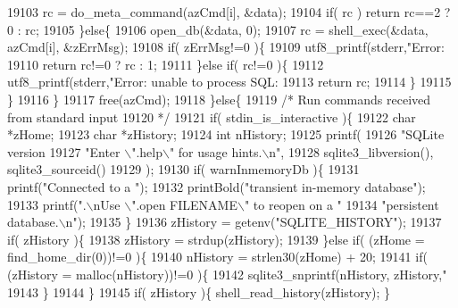 \begin{DoxyCode}
{{{{{{{{{{{{19103         rc = do_meta_command(azCmd[i], &data);
19104         \textcolor{keywordflow}{if}( rc ) \textcolor{keywordflow}{return} rc==2 ? 0 : rc;
19105       \}\textcolor{keywordflow}{else}\{
19106         open_db(&data, 0);
19107         rc = shell_exec(&data, azCmd[i], &zErrMsg);
19108         \textcolor{keywordflow}{if}( zErrMsg!=0 )\{
19109           utf8_printf(stderr,\textcolor{stringliteral}{"Error: %
19110           \textcolor{keywordflow}{return} rc!=0 ? rc : 1;
19111         \}\textcolor{keywordflow}{else} \textcolor{keywordflow}{if}( rc!=0 )\{
19112           utf8_printf(stderr,\textcolor{stringliteral}{"Error: unable to process SQL: %
19113           \textcolor{keywordflow}{return} rc;
19114         \}
19115       \}
19116     \}
19117     free(azCmd);
19118   \}\textcolor{keywordflow}{else}\{
19119     \textcolor{comment}{/* Run commands received from standard input}
19120 \textcolor{comment}{    */}
19121     \textcolor{keywordflow}{if}( stdin_is_interactive )\{
19122       \textcolor{keywordtype}{char} *zHome;
19123       \textcolor{keywordtype}{char} *zHistory;
19124       \textcolor{keywordtype}{int} nHistory;
19125       printf(
19126         \textcolor{stringliteral}{"SQLite version %
19127         \textcolor{stringliteral}{"Enter \(\backslash\)".help\(\backslash\)" for usage hints.\(\backslash\)n"},
19128         sqlite3_libversion(), sqlite3_sourceid()
19129       );
19130       \textcolor{keywordflow}{if}( warnInmemoryDb )\{
19131         printf(\textcolor{stringliteral}{"Connected to a "});
19132         printBold(\textcolor{stringliteral}{"transient in-memory database"});
19133         printf(\textcolor{stringliteral}{".\(\backslash\)nUse \(\backslash\)".open FILENAME\(\backslash\)" to reopen on a "}
19134                \textcolor{stringliteral}{"persistent database.\(\backslash\)n"});
19135       \}
19136       zHistory = getenv(\textcolor{stringliteral}{"SQLITE\_HISTORY"});
19137       \textcolor{keywordflow}{if}( zHistory )\{
19138         zHistory = strdup(zHistory);
19139       \}\textcolor{keywordflow}{else} \textcolor{keywordflow}{if}( (zHome = find_home_dir(0))!=0 )\{
19140         nHistory = strlen30(zHome) + 20;
19141         \textcolor{keywordflow}{if}( (zHistory = malloc(nHistory))!=0 )\{
19142           sqlite3_snprintf(nHistory, zHistory,\textcolor{stringliteral}{"%
19143         \}
19144       \}
19145       \textcolor{keywordflow}{if}( zHistory )\{ shell_read_history(zHistory); \}
}}}}}}}}}}}}}}}}
\end{DoxyCode}
